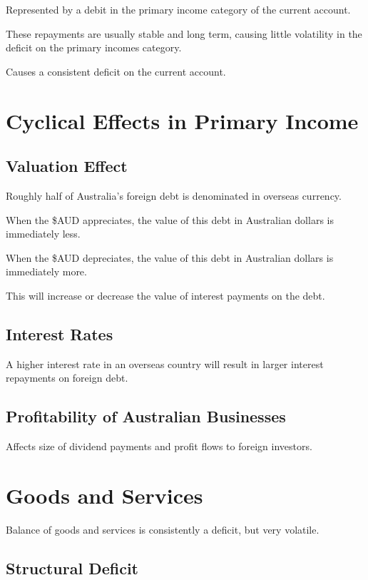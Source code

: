 \documentclass[a4paper,11pt]{article}
\begin{document}
Represented by a debit in the primary income category of the current account.

These repayments are usually stable and long term, causing little volatility
in the deficit on the primary incomes category.

Causes a consistent deficit on the current account.




\section{Cyclical Effects in Primary Income}

\subsection{Valuation Effect}

Roughly half of Australia's foreign debt is denominated in overseas currency.

When the \$AUD appreciates, the value of this debt in Australian dollars is
immediately less.

When the \$AUD depreciates, the value of this debt in Australian dollars is
immediately more.

This will increase or decrease the value of interest payments on the debt.


\subsection{Interest Rates}

A higher interest rate in an overseas country will result in larger interest
repayments on foreign debt.


\subsection{Profitability of Australian Businesses}

Affects size of dividend payments and profit flows to foreign investors.




\section{Goods and Services}

Balance of goods and services is consistently a deficit, but very volatile.


\subsection{Structural Deficit}
\end{document}
